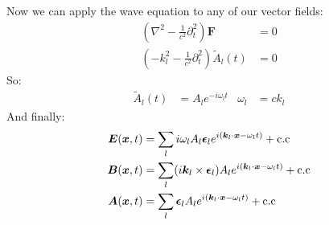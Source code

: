 Now we can apply the wave equation to any of our vector fields:
\begin{align*}
	\left(\nabla^2 - \frac{1}{c^2}\partial_t^2\right)\bm{F} &= 0 \\
	\left(-k_l^2 - \frac{1}{c^2}\partial_t^2\right)\tilde{A}_l(t) &= 0
\end{align*}
So:
\begin{align*}
	\tilde{A}_l(t) &= A_l e^{-i\omega_l t} & \omega_l &= c k_l
\end{align*}
And finally:
\begin{align*}
	\bm{E}(\bm{x},t) &= \sum_l i\omega_lA_l \bm{\epsilon}_l e^{i(\bm{k}_l\cdot\bm{x} -\omega_l t)} + \text{c.c} \\
	\bm{B}(\bm{x},t) &= \sum_l (i\bm{k}_l\times\bm{\epsilon}_l)A_l e^{i(\bm{k}_l\cdot\bm{x} - \omega_l t)} + \text{c.c} \\
	\bm{A}(\bm{x},t) &= \sum_l \bm{\epsilon}_l A_l e^{i(\bm{k}_l\cdot\bm{x} -\omega_l t)} + \text{c.c}
\end{align*}
